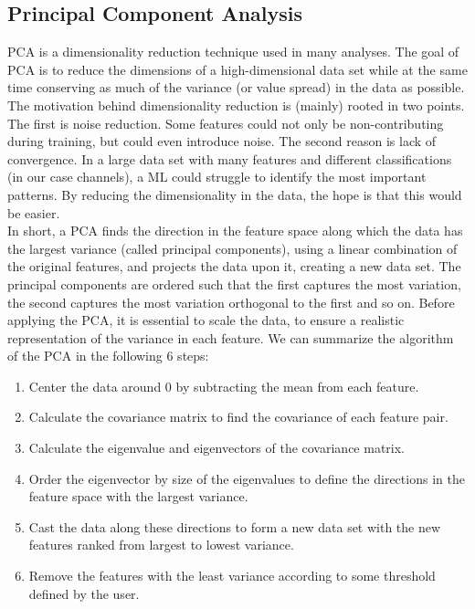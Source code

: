 \subsection{Principal Component Analysis}\label{subsec:PCA}
\acf{PCA} is a dimensionality reduction technique used in many analyses. The goal of
\ac{PCA} is to reduce the dimensions of a high-dimensional data set while at the same time conserving as 
much of the variance (or value spread) in the data as possible. The motivation behind dimensionality reduction 
is (mainly) rooted in two points. The first is noise reduction. Some features could not only be non-contributing 
during training, but could even introduce noise. The second reason is lack of convergence. In a large 
data set with many features and different classifications (in our case channels), a \ac{ML} could struggle
to identify the most important patterns. By reducing the dimensionality in the data, the hope is that this 
would be easier. 
\\
In short, a \ac{PCA} finds the direction in the feature space along which the data has the largest 
variance (called principal components), using a linear combination of the original features, and projects the
data upon it, creating a new data set. The principal components are ordered such that the first captures the most variation,
the second captures the most variation orthogonal to the first and so on. Before applying the \ac{PCA}, it is essential to 
scale the data, to ensure a realistic representation of the variance in each feature.  We can summarize the algorithm of the 
\ac{PCA} in the following 6 steps:
\begin{enumerate}
    \item Center the data around 0 by subtracting the mean from each feature.
    \item Calculate the covariance matrix to find the covariance 
                             of each feature pair.
    \item Calculate the eigenvalue and eigenvectors of the covariance matrix.
    \item Order the eigenvector by size of the eigenvalues to define the directions 
                             in the feature space with the largest variance.
    \item Cast the data along these directions to form a new data set with 
                             the new features ranked from largest to lowest variance.
    \item Remove the features with the least variance according to some threshold
                            defined by the user.                      
\end{enumerate}
